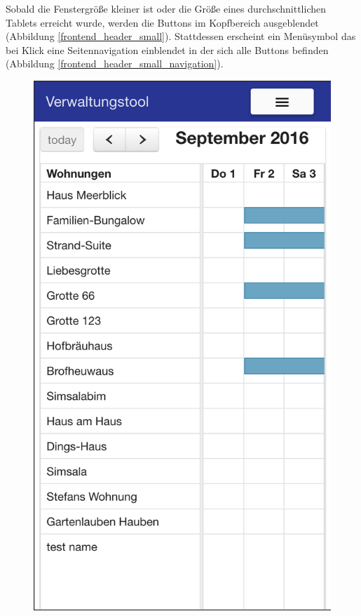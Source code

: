Sobald die Fenstergröße kleiner ist oder die Größe eines durchschnittlichen Tablets erreicht wurde, werden die Buttons im Kopfbereich ausgeblendet
(Abbildung \ref{frontend_header_small}). Stattdessen erscheint ein Menüsymbol das bei Klick eine Seitennavigation einblendet in der sich alle Buttons befinden
 (Abbildung \ref{frontend_header_small_navigation}).

\begin{figure}[H]
    \centering
    \begin{minipage}[t]{0.49\linewidth}
        \centering
        \includegraphics[width=\linewidth]{images/frontend_header_small.png}

\end{minipage}
\end{figure}
